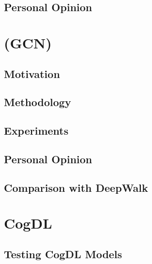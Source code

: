 \documentclass[12pt,a4paper]{article}
\begin{document}
	\subsection{Personal Opinion}
	\noindent 
	
	\newpage
	\section{(GCN)}
	
	\subsection{Motivation}
	\noindent 
	
	\subsection{Methodology}
	\noindent 
	
	\subsection{Experiments}
	\noindent 
	
	\subsection{Personal Opinion}
	\noindent 
	
	\subsection{Comparison with DeepWalk}
	\noindent 
	
	\newpage
	\section{CogDL}
	
	\subsection{Testing CogDL Models}
	
\end{document}

